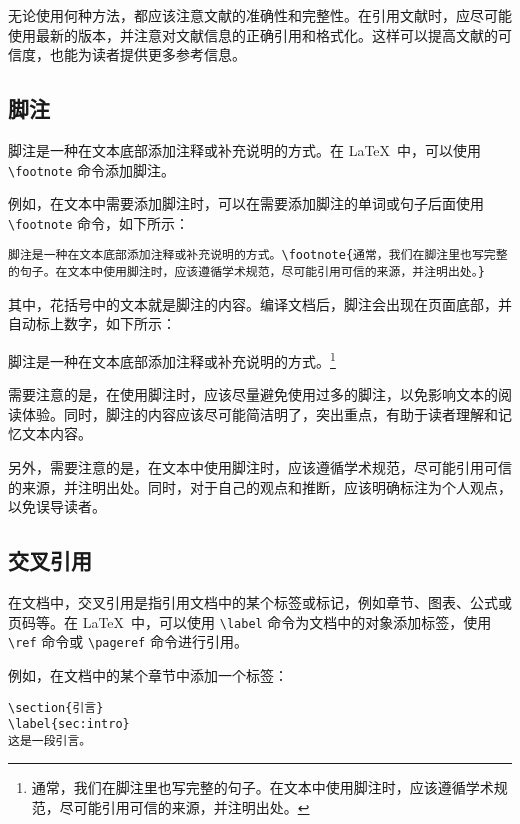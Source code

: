 无论使用何种方法，都应该注意文献的准确性和完整性。在引用文献时，应尽可能使用最新的版本，并注意对文献信息的正确引用和格式化。这样可以提高文献的可信度，也能为读者提供更多参考信息。

\subsection{脚注}

脚注是一种在文本底部添加注释或补充说明的方式。在 \LaTeX\ 中，可以使用 \verb|\footnote| 命令添加脚注。

例如，在文本中需要添加脚注时，可以在需要添加脚注的单词或句子后面使用 \verb|\footnote| 命令，如下所示：

\begin{verbatim}
脚注是一种在文本底部添加注释或补充说明的方式。\footnote{通常，我们在脚注里也写完整的句子。在文本中使用脚注时，应该遵循学术规范，尽可能引用可信的来源，并注明出处。}
\end{verbatim}

其中，花括号中的文本就是脚注的内容。编译文档后，脚注会出现在页面底部，并自动标上数字，如下所示：

脚注是一种在文本底部添加注释或补充说明的方式。\footnote{通常，我们在脚注里也写完整的句子。在文本中使用脚注时，应该遵循学术规范，尽可能引用可信的来源，并注明出处。}

需要注意的是，在使用脚注时，应该尽量避免使用过多的脚注，以免影响文本的阅读体验。同时，脚注的内容应该尽可能简洁明了，突出重点，有助于读者理解和记忆文本内容。

另外，需要注意的是，在文本中使用脚注时，应该遵循学术规范，尽可能引用可信的来源，并注明出处。同时，对于自己的观点和推断，应该明确标注为个人观点，以免误导读者。

\subsection{交叉引用}

在文档中，交叉引用是指引用文档中的某个标签或标记，例如章节、图表、公式或页码等。在 \LaTeX\ 中，可以使用 \verb|\label| 命令为文档中的对象添加标签，使用 \verb|\ref| 命令或 \verb|\pageref| 命令进行引用。

例如，在文档中的某个章节中添加一个标签：

\begin{verbatim}
\section{引言}
\label{sec:intro}
这是一段引言。
\end{verbatim}

